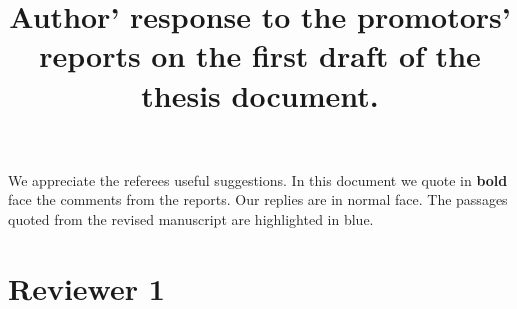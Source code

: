 \documentclass[11pt]{article}
\date{\vspace{-10ex}}
\begin{document}
\title{Author' response to the promotors' reports on the first draft of the thesis document.} 

\maketitle

\hspace{-0.6cm}We appreciate the referees useful suggestions.
In this document we quote in \textbf{bold} face the comments from the reports.
Our replies are in normal face.
The passages quoted from the revised manuscript are highlighted in \color{blue}blue\color{black}.

\section*{Reviewer 1}
\end{document}
